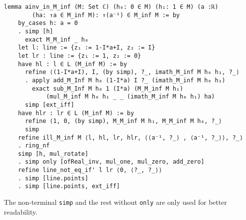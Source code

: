 \begin{lstlisting}
lemma ainv_in_M_inf (M: Set ℂ) (h₀: 0 ∈ M) (h₁: 1 ∈ M) (a :ℝ) 
        (ha: ↑a ∈ M_inf M): ↑(a⁻¹) ∈ M_inf M := by
    by_cases h: a = 0
    . simp [h]
      exact M_M_inf _ h₀
    let l: line := {z₁ := 1-I*a+I, z₂ := I}
    let lr : line := {z₁ := 1, z₂ := 0}
    have hl : l ∈ L (M_inf M) := by
      refine ⟨(1-I*a+I), I, (by simp), ?_, imath_M_inf M h₀ h₁, ?_⟩
      . apply add_M_Inf M h₀ (1-I*a) I ?_ (imath_M_inf M h₀ h₁)
        exact sub_M_Inf M h₀ 1 (I*a) (M_M_inf M h₁) 
            (mul_M_inf M h₀ h₁ _ _ (imath_M_inf M h₀ h₁) ha)
      simp [ext_iff]
    have hlr : lr ∈ L (M_inf M) := by
      refine ⟨1, 0, (by simp), M_M_inf M h₁, M_M_inf M h₀, ?_⟩
      simp
    refine ill_M_inf M ⟨l, hl, lr, hlr, ⟨⟨a⁻¹, ?_⟩ , ⟨a⁻¹, ?_⟩⟩, ?_⟩
    . ring_nf
    simp [h, mul_rotate]
    . simp only [ofReal_inv, mul_one, mul_zero, add_zero]
    refine line_not_eq_if' l lr ⟨0, ⟨?_, ?_⟩⟩
    . simp [line.points]
    . simp [line.points, ext_iff]
\end{lstlisting}
\begin{remark}
    The non-terminal \verb|simp| and the rest without \verb|only| are only used for better readability.
\end{remark}

